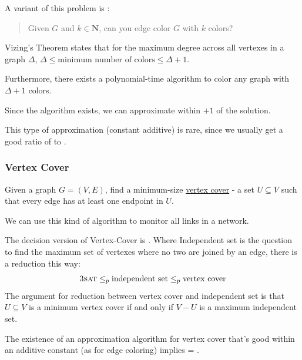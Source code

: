                     A variant of this problem is \npcomplete:
                    \begin{quotation}
                        Given $G$ and $k \in \mathbf{N}$, can you edge color $G$ with $k$ colors?
                    \end{quotation}

                    Vizing's Theorem states that for the maximum degree across all vertexes in a graph $\Delta$, $\Delta \le \text{minimum number of colors} \le \Delta +1 $.

                    Furthermore, there exists a polynomial-time algorithm to color any graph with $\Delta+1$ colors.

                    Since the algorithm exists, we can approximate within $+1$ of the \opt solution.

                    This type of approximation (constant additive) is rare, since we usually get a good ratio of \appr to \opt.
                \subsubsection{Vertex Cover} %
                \label{ssub:vertex_cover}
                    Given a graph $G = (V, E)$, find a minimum-size \uline{vertex cover} - a set $U \subseteq V$ such that every edge has at least one endpoint in $U$.

                    We can use this kind of algorithm to monitor all links in a network.

                    The decision version of Vertex-Cover is \npcomplete.
                    Where Independent set is the question to find the maximum set of vertexes where no two are joined by an edge, there is a reduction this way:
                    \begin{align*}
                        \textsc{3sat} \le_p \text{independent set} \le_p \text{vertex cover}
                    \end{align*}
                    The argument for reduction between vertex cover and independent set is that $U \subseteq V$ is a minimum vertex cover if and only if $V - U$ is a maximum independent set.

                    The existence of an approximation algorithm for vertex cover that's good within an additive constant (as for edge coloring) implies \p = \np.
